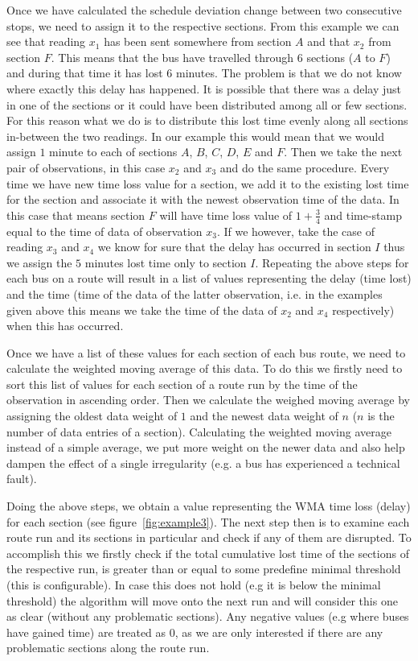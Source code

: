 Once we have calculated the schedule deviation change between two consecutive stops, we need to assign it to the respective sections. From this example we can see that reading $x_1$ has been sent somewhere from section $A$ and that $x_2$ from section $F$. This means that the bus have travelled through 6 sections ($A$ to $F$) and during that time it has lost $6$ minutes. The problem is that we do not know where exactly this delay has happened. It is possible that there was a delay just in one of the sections or it could have been distributed among all or few sections. For this reason what we do is to distribute this lost time evenly along all sections in-between the two readings. In our example this would mean that we would assign $1$ minute to each of sections $A$, $B$, $C$, $D$, $E$ and $F$. Then we take the next pair of observations, in this case $x_2$ and $x_3$ and do the same procedure. Every time we have new time loss value for a section, we add it to the existing lost time for the section and associate it with the newest observation time of the data. In this case that means section $F$ will have time loss value of $1+\frac{3}{4}$ and time-stamp equal to the time of data of observation $x_3$. If we however, take the case of reading $x_3$ and $x_4$ we know for sure that the delay has occurred in section $I$ thus we assign the $5$ minutes lost time only to section $I$. Repeating the above steps for each bus on a route will result in a list of values representing the delay (time lost) and the time (time of the data of the latter observation, i.e. in the examples given above this means we take the time of the data of $x_2$ and $x_4$ respectively) when this has occurred.
 
Once we have a list of these values for each section of each bus route, we need to calculate the weighted moving average of this data. To do this we firstly need to sort this list of values for each section of a route run by the time of the observation in ascending order. Then we calculate the weighed moving average by assigning the oldest data weight of $1$ and the newest data weight of $n$ ($n$ is the number of data entries of a section). Calculating the weighted moving average instead of a simple average, we put more weight on the newer data and also help dampen the effect of a single irregularity (e.g. a bus has experienced a technical fault).

Doing the above steps, we obtain a value representing the WMA time loss (delay) for each section (see figure~\ref{fig:example3}). The next step then is to examine each route run and its sections in particular and check if any of them are disrupted. To accomplish this we firstly check if the total cumulative lost time of the sections of the respective run, is greater than or equal to some predefine minimal threshold (this is configurable). In case this does not hold (e.g it is below the minimal threshold) the algorithm will move onto the next run and will consider this one as clear (without any problematic sections). Any negative values (e.g where buses have gained time) are treated as $0$, as we are only interested if there are any problematic sections along the route run.

